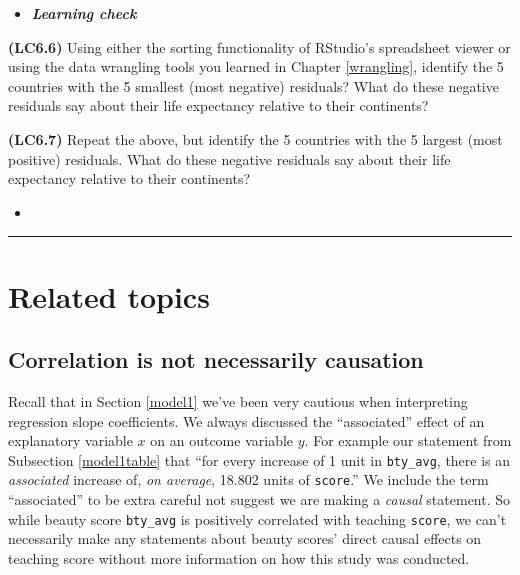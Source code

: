 \documentclass[12pt, krantz2,]{krantz}
\newenvironment{rmdblock}[1]
  {\begin{shaded*}
  \begin{itemize}
  \renewcommand{\labelitemi}{
    \raisebox{-.7\height}[0pt][0pt]{
    }
  }
  \item
  }
  {
  \end{itemize}
  \end{shaded*}
  }
\newenvironment{learncheck}
  {\begin{rmdblock}{warning}}
  {\end{rmdblock}}
\begin{document}
\begin{learncheck}
\textbf{\emph{Learning check}}
\end{learncheck}

\textbf{(LC6.6)} Using either the sorting functionality of RStudio's spreadsheet viewer or using the data wrangling tools you learned in Chapter \ref{wrangling}, identify the 5 countries with the 5 smallest (most negative) residuals? What do these negative residuals say about their life expectancy relative to their continents?

\textbf{(LC6.7)} Repeat the above, but identify the 5 countries with the 5 largest (most positive) residuals. What do these negative residuals say about their life expectancy relative to their continents?

\begin{learncheck}

\end{learncheck}

\begin{center}\rule{0.5\linewidth}{\linethickness}\end{center}

\hypertarget{related-topics}{%
\section{Related topics}\label{related-topics}}

\hypertarget{correlation-is-not-causation}{%
\subsection{Correlation is not necessarily causation}\label{correlation-is-not-causation}}

Recall that in Section \ref{model1} we've been very cautious when interpreting regression slope coefficients. We always discussed the ``associated'' effect of an explanatory variable \(x\) on an outcome variable \(y\). For example our statement from Subsection \ref{model1table} that ``for every increase of 1 unit in \texttt{bty\_avg}, there is an \emph{associated} increase of, \emph{on average}, 18.802 units of \texttt{score}.'' We include the term ``associated'' to be extra careful not suggest we are making a \emph{causal} statement. So while beauty score \texttt{bty\_avg} is positively correlated with teaching \texttt{score}, we can't necessarily make any statements about beauty scores' direct causal effects on teaching score without more information on how this study was conducted.
\end{document}
